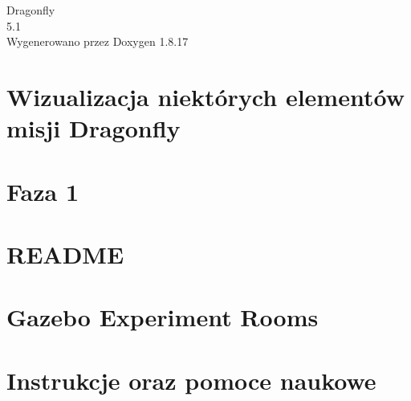 \let\mypdfximage\pdfximage\def\pdfximage{\immediate\mypdfximage}\documentclass[twoside]{book}
\newcommand{\+}{\discretionary{\mbox{\scriptsize$\hookleftarrow$}}{}{}}
\newcommand{\clearemptydoublepage}{%
  \newpage{\pagestyle{empty}\cleardoublepage}%
}
\begin{document}
\hypersetup{pageanchor=false,
             bookmarksnumbered=true,
             pdfencoding=unicode
            }
\begin{titlepage}
\vspace*{7cm}
\begin{center}%
{\Large Dragonfly \\[1ex]\large 5.\+1 }\\
\vspace*{1cm}
{\large Wygenerowano przez Doxygen 1.8.17}\\
\end{center}
\end{titlepage}
\clearemptydoublepage
{}
\tableofcontents
\clearemptydoublepage
{}
\hypersetup{pageanchor=true}

\chapter{Wizualizacja niektórych elementów misji Dragonfly}
\label{index}\hypertarget{index}{}
\chapter{Faza 1}
\label{md__r_e_a_d_m_e}

\chapter{R\+E\+A\+D\+ME}
\label{md_tests_bin_queue_8pyi_models_piston_rod_part_ariac__r_e_a_d_m_e}

\chapter{Gazebo Experiment Rooms}
\label{md_tests_doctest_extensions_synchronize_8pyi__r_e_a_d_m_e}

\chapter{Instrukcje oraz pomoce naukowe}
\label{md_tests_doctest_translation_8pyi_social-tracking-protection-linkedin-digest256_8vlpset__r_e_a_d_m_e}

\end{document}
